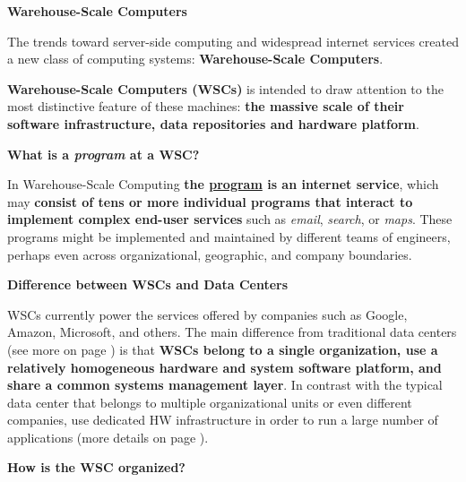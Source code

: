 \documentclass[a4paper]{article}
\newcommand{\definition}[1]{\textcolor{Red3}{\textbf{#1}}\index{#1}}
\begin{document}
    \newpage

    \begin{center}
        \textcolor{Red2}{\textbf{Warehouse-Scale Computers}}
    \end{center}

    \noindent
    The trends toward server-side computing and widespread internet services created a new class of computing systems: \textbf{Warehouse-Scale Computers}.

    \begin{definitionbox}
        \definition{Warehouse-Scale Computers (WSCs)} is intended to draw attention to the most distinctive feature of these machines: \textbf{the massive scale of their software infrastructure, data repositories and hardware platform}.
    \end{definitionbox}

    \begin{flushleft}
        \textcolor{Green3}{ \textbf{What is a \emph{program} at a WSC?}}
    \end{flushleft}

    \noindent
    In Warehouse-Scale Computing \textbf{the \underline{program} is an internet service}, which may \textbf{consist of tens or more individual programs that interact to implement complex end-user services} such as \emph{email}, \emph{search}, or \emph{maps}. These programs might be implemented and maintained by different teams of engineers, perhaps even across organizational, geographic, and company boundaries.

    \begin{flushleft}
        \textcolor{Green3}{ \textbf{Difference between WSCs and Data Centers}}
    \end{flushleft}

    \noindent
    WSCs currently power the services offered by companies such as Google, Amazon, Microsoft, and others. The main difference from traditional data centers (see more on page \pageref{Data Center definition}) is that \textbf{WSCs belong to a single organization, use a relatively homogeneous hardware and system software platform, and share a common systems management layer}. In contrast with the typical data center that belongs to multiple organizational units or even different companies, use dedicated HW infrastructure in order to run a large number of applications (more details on page \pageref{Data Center definition}).
    
    \begin{flushleft}
        \textcolor{Green3}{ \textbf{How is the WSC organized?}}
    \end{flushleft}
\end{document}
